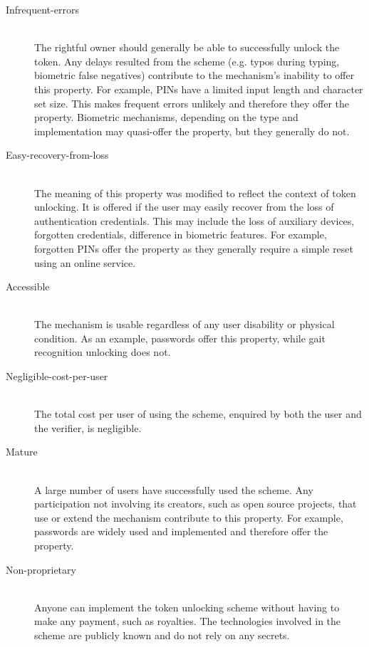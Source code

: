 \begin{description}
  \item[Infrequent-errors] \hfill \\
  The rightful owner should generally be able to successfully unlock the token. Any delays resulted from the scheme (e.g. typos during typing, biometric false negatives) contribute to the mechanism's inability to offer this property. For example, PINs have a limited input length and character set size. This makes frequent errors unlikely and therefore they offer the property. Biometric mechanisms, depending on the type and implementation may quasi-offer the property, but they generally do not.
    
  \item[Easy-recovery-from-loss] \hfill \\ 
  The meaning of this property was modified to reflect the context of token unlocking. It is offered if the user may easily recover from the loss of authentication credentials. This may include the loss of auxiliary devices, forgotten credentials, difference in biometric features. For example, forgotten PINs offer the property as they generally require a simple reset using an online service.
  
  \item[Accessible] \hfill \\
  The mechanism is usable regardless of any user disability or physical condition. As an example, passwords offer this property, while gait recognition unlocking does not. 
  
  \item[Negligible-cost-per-user] \hfill \\
  The total cost per user of using the scheme, enquired by both the user and the verifier, is negligible.
  
  \item[Mature] \hfill \\
  A large number of users have successfully used the scheme. Any participation not involving its creators, such as open source projects, that use or extend the mechanism contribute to this property. For example, passwords are widely used and implemented and therefore offer the property.
  
  \item[Non-proprietary] \hfill \\
  Anyone can implement the token unlocking scheme without having to make any payment, such as royalties. The technologies involved in the scheme are publicly known and do not rely on any secrets.
  

\end{description}

